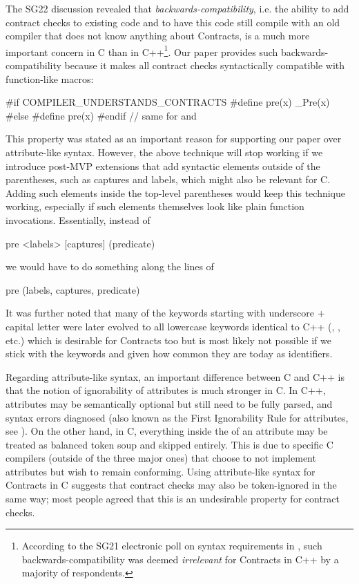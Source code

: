 The SG22 discussion revealed that \emph{backwards-compatibility}, i.e. the ability to add contract checks to existing code and to have this code still compile with an old compiler that does not know anything about Contracts, is a much more important concern in C than in C++\footnote{According to the SG21 electronic poll on syntax requirements in \cite{P2885R3}, such backwards-compatibility was deemed \emph{irrelevant} for Contracts in C++ by a majority of respondents.}. Our paper provides such backwards-compatibility because it makes all contract checks syntactically compatible with function-like macros:

\begin{codeblock}
#if COMPILER_UNDERSTANDS_CONTRACTS
  #define pre(x) _Pre(x)
#else
  #define pre(x)
#endif
// same for  and 
\end{codeblock}

This property was stated as an important reason for supporting our paper over attribute-like syntax. However, the above technique will stop working if we introduce post-MVP extensions that add syntactic elements outside of the parentheses, such as captures and labels,
which might also be relevant for C. Adding such elements inside the top-level parentheses would keep this technique working, especially if such elements themselves look like plain function invocations. Essentially, instead of

\begin{codeblock}
pre <labels> [captures] (predicate)
\end{codeblock}

we would have to do something along the lines of

\begin{codeblock}
pre (labels, captures, predicate)
\end{codeblock}

It was further noted that many of the keywords starting with underscore + capital letter were later evolved to all lowercase keywords identical to C++ (, , etc.) which is desirable for Contracts too but is most likely not possible if we stick with the keywords  and  given how common they are today as identifiers.

Regarding attribute-like syntax, an important difference between C and C++ is that the notion of ignorability of attributes is much stronger in C. In C++, attributes may be semantically optional but still need to be fully parsed, and syntax errors diagnosed (also known as the First Ignorability Rule for attributes, see \cite{P2552R3}). On the other hand, in C, everything inside the \tcode{[[...]]} of an attribute may be treated as balanced token soup and skipped entirely. This is due to specific C compilers (outside of the three major ones) that choose to not implement attributes but wish to remain conforming. Using attribute-like syntax for Contracts in C suggests that contract checks may also be token-ignored in the same way; most people agreed that this is an undesirable property for contract checks.

